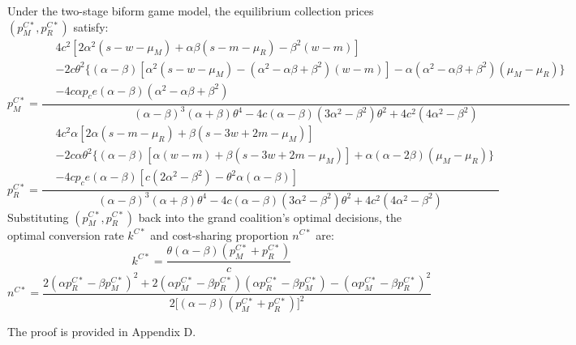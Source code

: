 \documentclass[authoryear,preprint,review,times,10pt]{elsarticle}
\begin{document}
\begin{prop}
\label{prop:biform}
Under the two-stage biform game model, the equilibrium collection prices $(p_M^{C*}, p_R^{C*})$ satisfy:
\begin{equation}
p_M^{C*} = \frac{
\displaystyle
\begin{aligned}
&4c^2 \left[ 2\alpha^2(s - w - \mu_M) + \alpha\beta(s - m - \mu_R) - \beta^2(w - m) \right] \\
&- 2c\theta^2 \Big\{ (\alpha-\beta) \left[ \alpha^2(s - w - \mu_M) - (\alpha^2 - \alpha\beta + \beta^2)(w - m) \right] - \alpha(\alpha^2 - \alpha\beta + \beta^2)(\mu_M - \mu_R) \Big\} \\
&- 4c\alpha p_c e (\alpha - \beta)(\alpha^2 - \alpha\beta + \beta^2)
\end{aligned}
}{
\displaystyle (\alpha-\beta)^3(\alpha+\beta)\theta^4 - 4c(\alpha-\beta)(3\alpha^2-\beta^2)\theta^2 + 4c^2(4\alpha^2-\beta^2)
}
\end{equation}
\begin{equation}
p_R^{C*} = \frac{
\displaystyle
\begin{aligned}
&4c^2\alpha \left[ 2\alpha(s - m - \mu_R) + \beta(s - 3w + 2m - \mu_M) \right] \\
&- 2c\alpha\theta^2 \Big\{ (\alpha-\beta) \left[ \alpha(w - m) + \beta(s - 3w + 2m - \mu_M) \right] + \alpha(\alpha - 2\beta)(\mu_M - \mu_R) \Big\} \\
&- 4c p_c e (\alpha - \beta) \left[ c(2\alpha^2 - \beta^2) - \theta^2\alpha(\alpha - \beta) \right]
\end{aligned}
}{
\displaystyle (\alpha-\beta)^3(\alpha+\beta)\theta^4 - 4c(\alpha-\beta)(3\alpha^2-\beta^2)\theta^2 + 4c^2(4\alpha^2-\beta^2)
}
\end{equation}
Substituting $(p_M^{C*}, p_R^{C*})$ back into the grand coalition's optimal decisions, the optimal conversion rate $k^{C*}$ and cost-sharing proportion $n^{C*}$ are:
\begin{equation}
k^{C*} = \frac{\theta(\alpha-\beta)(p_M^{C*} + p_R^{C*})}{c}
\end{equation}
\begin{equation}
n^{C*} = \frac{2(\alpha p_R^{C*} - \beta p_M^{C*})^2 + 2(\alpha p_M^{C*} - \beta p_R^{C*})(\alpha p_R^{C*} - \beta p_M^{C*}) - (\alpha p_M^{C*} - \beta p_R^{C*})^2}{2 \big[ (\alpha-\beta)(p_M^{C*} + p_R^{C*}) \big]^2}
\end{equation}
\end{prop}

 The proof is provided in Appendix D.
\end{document}
